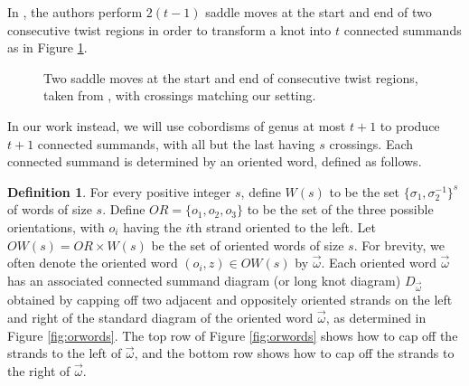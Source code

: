 \documentclass[12pt]{amsart}
\theoremstyle{definition}
\newtheorem{definition}[theorem]{Definition}
\theoremstyle{remark}
\numberwithin{equation}{section}
\begin{document}
In \cite[Lemma 2 (ii)]{BKLMR}, the authors perform $2(t-1)$ saddle moves at the start and end of two consecutive twist regions in order to transform a knot into $t$ connected summands as in Figure \ref{fig:BKLMR}.

\begin{figure}[!h]
\begin{center}
\end{center}
\caption{\label{fig:BKLMR} Two saddle moves at the start and end of consecutive twist regions, taken from \cite[Figure 3]{BKLMR}, with crossings matching our setting.}
\end{figure}


In our work instead, we will use cobordisms of genus at most $t+1$ to produce $t+1$ connected summands, with all but the last having $s$ crossings.  Each connected summand is determined by an oriented word, defined as follows.

\begin{definition}
\label{def:OW}
For every positive integer $s$, define $W(s)$ to be the set $\{\sigma_1,\sigma_2^{-1}\}^s$ of words of size $s$.  Define $OR=\{o_1, o_2,o_3\}$ to be the set of the three possible orientations, with $o_i$ having the $i$th strand oriented to the left.  Let $OW(s)=OR\times W(s)$ be the set of oriented words of size $s$. For brevity, we often denote the oriented word $(o_i,z)\in OW(s)$ by $\vec{\omega}$. Each oriented word $\vec{\omega}$ has an associated connected summand diagram (or long knot diagram) $D_{\vec{\omega}}$ obtained by capping off two adjacent and oppositely oriented strands on the left and right of the standard diagram of the oriented word $\vec{\omega}$, as determined in Figure \ref{fig:orwords}. The top row of Figure \ref{fig:orwords} shows how to cap off the strands to the left of $\vec{\omega}$, and the bottom row shows how to cap off the strands to the right of $\vec{\omega}$.
\end{definition}
\end{document}
